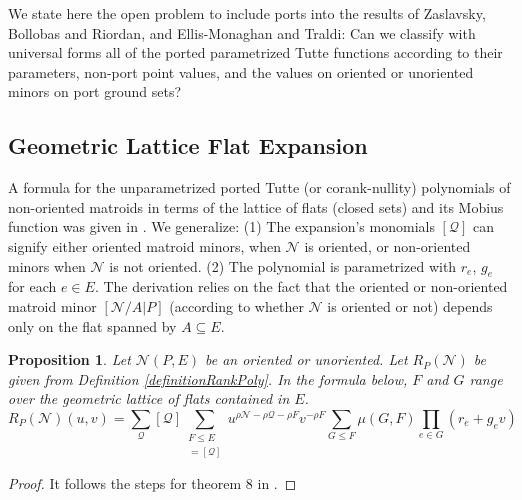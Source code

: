 \documentclass[12pt]{article}
\newcommand \comment[1]{}                       %
\renewcommand \comment[1]{\emph{#1}}            %
\newtheorem{proposition}[theorem]{Proposition}
\theoremstyle{definition}
\newcommand{\rank}{{\rho}}%
\begin{document}
We state here the open problem to include ports into the results of 
Zaslavsky, Bollobas and Riordan, and Ellis-Monaghan and Traldi:
Can we classify with universal forms all of the ported parametrized Tutte
functions according to their parameters, non-port
point values, and the 
values on oriented or unoriented minors on port ground sets?  


\subsection{Geometric Lattice Flat Expansion}

A formula for the unparametrized ported Tutte (or corank-nullity) 
polynomials
of non-oriented matroids in terms of the lattice of flats (closed sets)
and its Mobius function was given in \cite{sdcPorted}.  
We generalize: (1) The expansion's
monomials $[\mathcal{Q}]$ can signify either oriented matroid minors,
when $\mathcal{N}$ is oriented, or non-oriented minors
when $\mathcal{N}$ is not oriented.  (2) The polynomial is parametrized
with $r_e$, $g_e$ for each $e\in E$.
The derivation relies on the
fact that the oriented or non-oriented matroid minor $[\mathcal{N}/A|P]$
(according to whether $\mathcal{N}$ is oriented or not) depends
only on the flat spanned by $A\subseteq E$.  

\begin{proposition}
Let $\mathcal{N}(P,E)$ be an oriented or unoriented.
Let $R_P(\mathcal{N})$ be given from Definition 
\ref{definitionRankPoly}.
In the formula below,
$F$ and $G$ range over the geometric lattice of flats contained
in $E$.
\begin{equation}
R_P(\mathcal{N})(u,v) = \sum_{\mathcal{Q}}[\mathcal{Q}]
      \sum_{\substack{F\leq E\\
                     [\mathcal{N}/F|P]=[\mathcal{Q}]
           }}
                   u^{\rank{\mathcal{N}}-\rank{\mathcal{Q}}-\rank{F}}
                   v^{-\rank{F}}
                   \sum_{G\le F}
                   \mu(G,F)
                   \prod_{e\in G}
                    (r_e+g_ev)
\end{equation}
\end{proposition}

\begin{proof}
It follows the steps for theorem 8 in \cite{sdcPorted}.
\end{proof}
\end{document}
